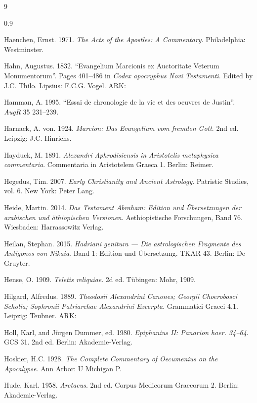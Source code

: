 \begin{thebibliography}{9}
\begin{spacing}{0.9}
\begin{small}
Haenchen, Ernst. 1971. %
\textit{The Acts of the Apostles: A Commentary}. %
Philadelphia: Westminster. %

Hahn, Augustus. 1832. %
“Evangelium Marcionis ex Auctoritate Veterum Monumentorum”. 
Pages 401--486 in \textit{Codex apocryphus Novi Testamenti}. %
Edited by J.C. Thilo. %
Lipsius: F.C.G. Vogel. %
ARK: 

Hamman, A. 1995. “Essai de chronologie de la vie et des oeuvres de Justin”. %
\textit{AugR} 35 231–239. %

Harnack, A. von. 1924. %
\textit{Marcion: Das Evangelium vom fremden Gott}. 2nd ed. %
Leipzig: J.C. Hinrichs. %

Hayduck, M. 1891. %
\textit{Alexandri Aphrodisiensis in Aristotelis metaphysica commentaria}. %
Commentaria in Aristotelem Graeca 1. %
Berlin: Reimer. %

Hegedus, Tim. 2007. %
\textit{Early Christianity and Ancient Astrology}. %
Patristic Studies, vol. 6. %
New York: Peter Lang. %

Heide, Martin. 2014. \textit{Das Testament Abraham: %
Edition und Übersetzungen der arabischen und äthiopischen Versionen}. %
Aethiopistische Forschungen, Band 76. %
Wiesbaden: Harrassowitz Verlag. %

Heilan, Stephan. 2015. \textit{Hadriani genitura --- %
Die astrologischen Fragmente des Antigonos von Nikaia}. %
Band 1: Edition und Übersetzung. TKAR 43. %
Berlin: De Gruyter. %

Hense, O. 1909. \textit{Teletis reliquiae}. 2d ed. %
Tübingen: Mohr, 1909. %

Hilgard, Alfredus. 1889. %
\textit{Theodosii Alexandrini Canones; Georgii Choerobosci Scholia; Sophronii Patriarchae Alexandrini Excerpta}. %
Grammatici Graeci 4.1. %
Leipzig: Teubner. %
ARK:  %

Holl, Karl, and Jürgen Dummer, ed. 1980. %
\textit{Epiphanius II: Panarion haer. 34--64}. %
GCS 31. 2nd ed. %
Berlin: Akademie-Verlag. %

Hoskier, H.C. 1928. %
\textit{The Complete Commentary of Oecumenius on the Apocalypse}. %
Ann Arbor: U Michigan P. %

Hude, Karl. 1958. \textit{Aretaeus}. 2nd ed. %
Corpus Medicorum Graecorum 2. %
Berlin: Akademie-Verlag. %


\end{small}
\end{spacing}
\end{thebibliography}

